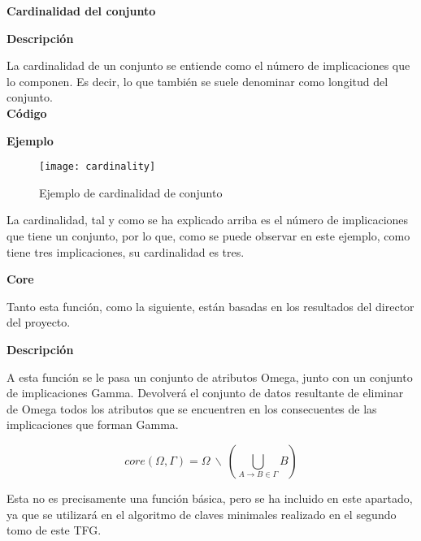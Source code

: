     

    \clearpage

\textbf{ \large Cardinalidad del conjunto}

\smallskip

    \textbf{Descripci\'on}

    La cardinalidad de un conjunto se entiende como el n\'umero de implicaciones que lo componen. Es decir, lo que 
    tambi\'en se suele denominar como longitud del conjunto.
    \\


    \textbf{C\'odigo}

    
    \bigskip

    \textbf{Ejemplo}


    \begin{figure}[H]
        \centering
        \texttt{[image: cardinality]}
        \caption{Ejemplo de cardinalidad de conjunto}
        \label{fig:cardinality}
    \end{figure}

    La cardinalidad, tal y como se ha explicado arriba es el n\'umero de implicaciones que tiene un conjunto, por lo que, como 
    se puede observar en este ejemplo, como tiene tres implicaciones, su cardinalidad es tres.
     

    \clearpage

\textbf{ \large Core}

\smallskip

Tanto esta funci\'on, como la siguiente, est\'an basadas en los resultados del director del proyecto\cite{corebody}.

\smallskip

    \textbf{Descripci\'on}

    A esta funci\'on se le pasa un conjunto de atributos Omega, junto con un conjunto de implicaciones Gamma. 
    Devolver\'a el conjunto de datos resultante de eliminar de Omega todos los atributos que se encuentren en los 
    consecuentes de las implicaciones que forman Gamma. 

    \[
        core(\Omega , \Gamma ) = \Omega ~ \backslash ~ ( \bigcup_{A \to B \in \Gamma} B )    
    \]
    
    Esta no es precisamente una funci\'on b\'asica, pero se ha incluido en este apartado, ya que se utilizar\'a 
    en el algoritmo de claves minimales realizado en el segundo tomo de este TFG.
    \\

